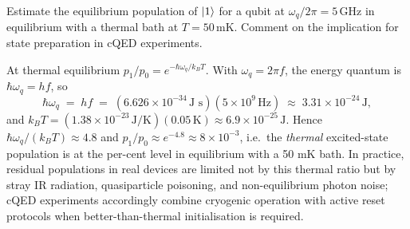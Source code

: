 \begin{exercise}
Estimate the equilibrium population of $\ket{1}$ for a qubit at
$\omega_q/2\pi=5\,\text{GHz}$ in equilibrium with a thermal bath at
$T=50\,\text{mK}$. Comment on the implication for state preparation
in cQED experiments.
\begin{solution}
At thermal equilibrium $p_1/p_0=e^{-\hbar\omega_q/k_B T}$. With
$\omega_q=2\pi f$, the energy quantum is $\hbar\omega_q=h f$, so
\[
\hbar\omega_q \;=\; h f
\;=\; (6.626\times 10^{-34}\,\text{J s})(5\times 10^9\,\text{Hz})
\;\approx\; 3.31\times 10^{-24}\,\text{J},
\]
and $k_B T=(1.38\times 10^{-23}\,\text{J/K})(0.05\,\text{K})
\approx 6.9\times 10^{-25}\,\text{J}$. Hence
$\hbar\omega_q/(k_B T)\approx 4.8$ and
$p_1/p_0\approx e^{-4.8}\approx 8\times 10^{-3}$, i.e.\ the
\emph{thermal} excited-state population is at the per-cent level
in equilibrium with a 50 mK bath. In practice, residual
populations in real devices are limited not by this thermal
ratio but by stray IR radiation, quasiparticle poisoning, and
non-equilibrium photon noise; cQED experiments accordingly
combine cryogenic operation with active reset protocols when
better-than-thermal initialisation is required.
\end{solution}
\end{exercise}
